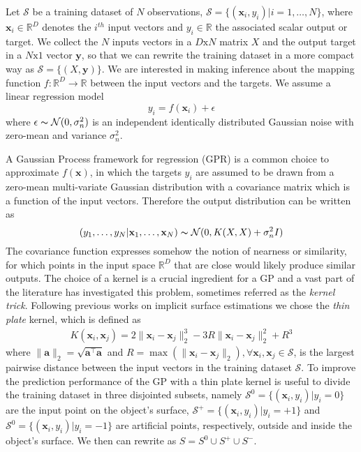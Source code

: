 Let $\mathcal{S}$ be a training dataset of $N$ observations, $\mathcal{S}=\{(\mathbf{x}_i, y_i)|i=1,\dots,N\}$, where $\mathbf{x}_i\in\mathbb{R}^D$ denotes the $i^{th}$ input vectors and $y_i\in\mathbb{R}$ the associated scalar output or target.  We collect the $N$ inputs vectors in a $D\text{x}N$ matrix $X$ and the output target in a $N\text{x}1$ vector $\mathbf{y}$, so that we can rewrite the training dataset in a more compact way as $\mathcal{S}=\{(X,\mathbf{y})\}$. We are interested in making inference about the mapping function $f:\mathbb{R}^D\rightarrow\mathbb{R}$ between the input vectors and the targets. We assume a linear regression model
$$
y_i=f(\mathbf{x}_i)+\epsilon
$$
where $\epsilon\thicksim\mathcal{N}(0,\sigma_n^2)$ is an independent identically distributed Gaussian noise with zero-mean and variance $\sigma_n^2$. 

A Gaussian Process framework for regression (GPR) is a common choice to approximate $f(\mathbf{x})$, in which the targets $y_i$ are assumed to be drawn from a zero-mean multi-variate Gaussian distribution with a covariance matrix which is a function of the input vectors. Therefore the output distribution can be written as
$$
(y_1,\dots,y_N|\mathbf{x}_1,\dots,\mathbf{x}_N)\thicksim\mathcal{N}(0,K(X,X)+\sigma_n^2I)
$$
The covariance function expresses somehow the notion of nearness or similarity, for which points in the input space $\mathbb{R}^D$ that are close would likely produce similar outputs. The choice of a kernel is a crucial ingredient for a GP and a vast part of the literature has investigated this problem, sometimes referred as the \emph{kernel trick}. Following previous works on implicit surface estimations we chose the \emph{thin plate} kernel, which is defined as
\begin{eqnarray}
\label{eq:thinplate}
K(\mathbf{x}_i,\mathbf{x}_j)=2\|\mathbf{x}_i-\mathbf{x}_j\|_2^3-3R\|\mathbf{x}_i-\mathbf{x}_j\|_2^2+R^3
\end{eqnarray}
where $\|\mathbf{a}\|_2=\sqrt{\mathbf{a}^\top\mathbf{a}}$ and $R=\max(\|\mathbf{x}_i-\mathbf{x}_j\|_2),\forall\mathbf{x}_i,\mathbf{x}_j\in\mathcal{S}$, is the largest pairwise distance between the input vectors in the training dataset $\mathcal{S}$. To improve the prediction performance of the GP with a thin plate kernel is useful to divide the training dataset in three disjointed subsets, namely $\mathcal{S}^0=\{(\mathbf{x}_i,y_i)|y_i=0\}$ are the input point on the object's surface, $\mathcal{S}^+=\{(\mathbf{x}_i,y_i)|y_i=+1\}$ and $\mathcal{S}^0=\{(\mathbf{x}_i,y_i)|y_i=-1\}$ are artificial points, respectively, outside and inside the object's surface. We then can rewrite as $S=S^0\cup S^+\cup S^-$.


